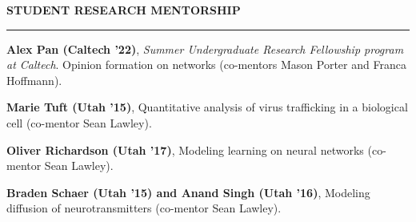 \documentclass{resume} %
\renewenvironment{rSection}[1]{
\sectionskip
\textcolor{WinePurple}{\MakeUppercase{#1}}
\sectionlineskip
\hrule
\begin{list}{}{
\setlength{\leftmargin}{1.5em}
}
\item[]
}{
\end{list}
}
\begin{document}
\begin{rSection}{\bf Student Research Mentorship}
    \item \textbf{Alex Pan (Caltech '22)}, {\em Summer Undergraduate Research Fellowship program at Caltech}. Opinion formation on networks (co-mentors Mason Porter and Franca Hoffmann).
    
    \item \textbf{Marie Tuft (Utah '15)}, Quantitative analysis of virus trafficking in a biological cell (co-mentor Sean Lawley).
    
    \item \textbf{Oliver Richardson (Utah '17)}, Modeling learning on neural networks (co-mentor Sean Lawley).
    
    \item \textbf{Braden Schaer (Utah '15) and Anand Singh (Utah '16)}, Modeling diffusion of neurotransmitters (co-mentor Sean Lawley).

\end{rSection}

\newpage
\end{document}
